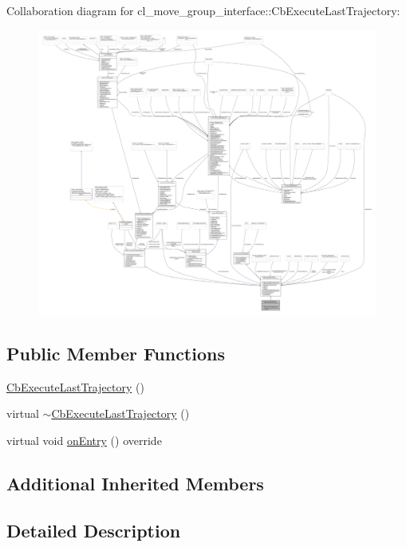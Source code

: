 Collaboration diagram for cl\+\_\+move\+\_\+group\+\_\+interface\+:\+:Cb\+Execute\+Last\+Trajectory\+:
\nopagebreak
\begin{figure}[H]
\begin{center}
\leavevmode
\includegraphics[width=350pt]{classcl__move__group__interface_1_1CbExecuteLastTrajectory__coll__graph}
\end{center}
\end{figure}
\subsection*{Public Member Functions}
\begin{DoxyCompactItemize}
\item 
\hyperlink{classcl__move__group__interface_1_1CbExecuteLastTrajectory_a7198565fc92e12873da31192cf116617}{Cb\+Execute\+Last\+Trajectory} ()
\item 
virtual \hyperlink{classcl__move__group__interface_1_1CbExecuteLastTrajectory_abac07779b8285daab48f2cf11bcc7558}{$\sim$\+Cb\+Execute\+Last\+Trajectory} ()
\item 
virtual void \hyperlink{classcl__move__group__interface_1_1CbExecuteLastTrajectory_ac78713663c39635ca5ac9a749503e800}{on\+Entry} () override
\end{DoxyCompactItemize}
\subsection*{Additional Inherited Members}


\subsection{Detailed Description}


